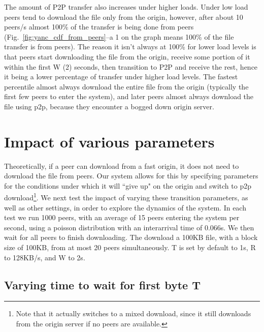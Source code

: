 The amount of P2P transfer also increases under higher loads.  Under low load peers tend to download the file only from the origin, however, after about 10 peers/s almost 100\% of the transfer is being done from peers (Fig.~\ref{fig:yanc_cdf_from_peers}--a 1 on the graph means 100\% of the file transfer is from peers).  The reason it isn't always at 100\% for lower load levels is that peers start downloading the file from the origin, receive some portion of it within the first W (2) seconds, then transition to P2P and receive the rest, hence it being a lower percentage of transfer under higher load levels.  The fastest percentile almost always download the entire file from the origin (typically the first few peers to enter the system), and later peers almost always download the file using p2p, because they encounter a bogged down origin server.

\section{Impact of various parameters}

Theoretically, if a peer can download from a fast origin,  it does not need to download the file from peers.  Our system allows for this by specifying parameters for the conditions under which it will ``give up" on the origin and switch to p2p download\footnote{Note that it actually switches to a mixed download, since it still downloads from the origin server if no peers are available.}.  We next test the impact of varying these transition parameters, as well as other settings, in order to explore the dynamics of the system.  In each test we run 1000 peers, with an average of 15 peers entering the system per second, using a poisson distribution with an interarrival time of 0.066s.  We then wait for all peers to finish downloading.  The download a 100KB file, with a block size of 100KB, from at most 20 peers simultaneously. T is set by default to 1s, R to 128KB/s, and W to 2s.

\subsection{Varying time to wait for first byte T}

